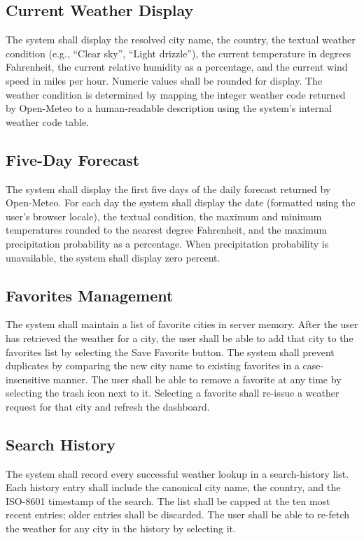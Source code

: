 \documentclass[11pt,letterpaper]{article}
\begin{document}
\subsection{Current Weather Display}
The system shall display the resolved city name, the country, the textual weather condition (e.g., ``Clear sky'', ``Light drizzle''), the current temperature in degrees Fahrenheit, the current relative humidity as a percentage, and the current wind speed in miles per hour. Numeric values shall be rounded for display. The weather condition is determined by mapping the integer weather code returned by Open-Meteo to a human-readable description using the system's internal weather code table.

\subsection{Five-Day Forecast}
The system shall display the first five days of the daily forecast returned by Open-Meteo. For each day the system shall display the date (formatted using the user's browser locale), the textual condition, the maximum and minimum temperatures rounded to the nearest degree Fahrenheit, and the maximum precipitation probability as a percentage. When precipitation probability is unavailable, the system shall display zero percent.

\subsection{Favorites Management}
The system shall maintain a list of favorite cities in server memory. After the user has retrieved the weather for a city, the user shall be able to add that city to the favorites list by selecting the Save Favorite button. The system shall prevent duplicates by comparing the new city name to existing favorites in a case-insensitive manner. The user shall be able to remove a favorite at any time by selecting the trash icon next to it. Selecting a favorite shall re-issue a weather request for that city and refresh the dashboard.

\subsection{Search History}
The system shall record every successful weather lookup in a search-history list. Each history entry shall include the canonical city name, the country, and the ISO-8601 timestamp of the search. The list shall be capped at the ten most recent entries; older entries shall be discarded. The user shall be able to re-fetch the weather for any city in the history by selecting it.
\end{document}
